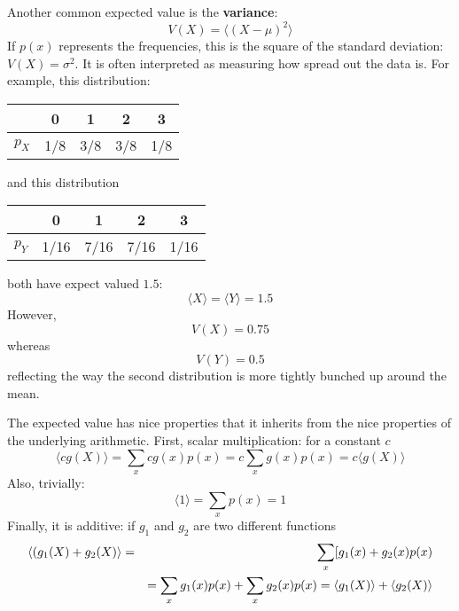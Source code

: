 \documentclass[11pt,a4paper]{scrartcl}
\begin{document}
Another common expected value is the \textbf{variance}:
\begin{equation}
V(X)=\langle (X-\mu)^2\rangle
\end{equation}
If $p(x)$ represents the frequencies, this is the square of the
standard deviation: $V(X)=\sigma^2$. It is often interpreted as measuring how spread out the data is. For example, this distribution:
\begin{center}
\begin{tabular}{c|cccc}
&0&1&2&3\\
\hline
$p_X$&1/8&3/8&3/8&1/8
\end{tabular}
\end{center}
and this distribution
\begin{center}
\begin{tabular}{c|cccc}
&0&1&2&3\\
\hline
$p_Y$&1/16&7/16&7/16&1/16
\end{tabular}
\end{center}
both have expect valued $1.5$:
\begin{equation}
\langle X\rangle = \langle Y\rangle = 1.5
\end{equation}
However,
\begin{equation}
V(X)=0.75
\end{equation}
whereas 
\begin{equation}
V(Y)=0.5
\end{equation}
reflecting the way the second distribution is more tightly bunched up
around the mean.

The expected value has nice properties that it inherits from the nice
properties of the underlying arithmetic. First, scalar multiplication:
for a constant $c$
\begin{equation}
\langle c g(X)\rangle =\sum_x cg(x)p(x)=c\sum_x g(x)p(x)=c\langle g(X)\rangle
\end{equation}
Also, trivially:
\begin{equation}
\langle 1\rangle=\sum_x p(x)=1
\end{equation}
Finally, it is additive: if $g_1$ and $g_2$ are two different
functions
\begin{eqnarray}
\langle (g_1(X)+g_2(X)\rangle &=&\sum_x [g_1(x)+g_2(x)p(x)\cr
&&=\sum_x g_1(x)p(x)+\sum_x g_2(x)p(x)=\langle g_1(X)\rangle+\langle g_2(X)\rangle
\end{eqnarray}
\end{document}
